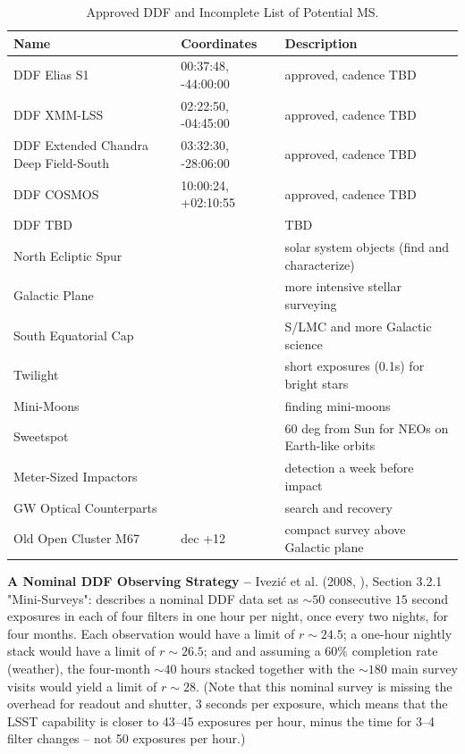 \documentclass[DM,lsstdraft,toc]{lsstdoc}
\begin{document}
\begin{table}[h]
\begin{center}
\begin{footnotesize}
\caption{Approved DDF and Incomplete List of Potential MS.}
\label{tab:ddfms}
\begin{tabular}{lll}
\hline \hline
Name & Coordinates & Description  \\
\hline
DDF Elias S1    & 00:37:48, -44:00:00  & approved, cadence TBD \\
DDF XMM-LSS & 02:22:50, -04:45:00  & approved, cadence TBD  \\
DDF Extended Chandra Deep Field-South & 03:32:30, -28:06:00  & approved, cadence TBD  \\
DDF COSMOS  & 10:00:24, +02:10:55 & approved, cadence TBD  \\
DDF TBD  & & TBD \\
North Ecliptic Spur      & & solar system objects (find and characterize) \\
Galactic Plane             & & more intensive stellar surveying \\
South Equatorial Cap  & & S/LMC and more Galactic science \\
Twilight                        & & short exposures (0.1s) for bright stars \\
Mini-Moons                     &  & finding mini-moons \\
Sweetspot                       & & 60 deg from Sun for NEOs on Earth-like orbits \\
Meter-Sized Impactors     & & detection a week before impact \\
GW Optical Counterparts & & search and recovery \\
Old Open Cluster M67      & dec +12 & compact survey above Galactic plane  \\
\hline
\end{tabular}
\end{footnotesize}
\end{center}
\end{table}

\textbf{A Nominal DDF Observing Strategy -- } Ivezi\'{c} et al. (2008, \citep{2008arXiv0805.2366I}), Section 3.2.1 "Mini-Surveys": describes a nominal DDF data set as $\sim50$ consecutive $15$ second exposures in each of four filters in one hour per night, once every two nights, for four months. Each observation would have a limit of $r\sim24.5$; a one-hour nightly stack would have a limit of $r\sim26.5$; and and assuming a $60\%$ completion rate (weather), the four-month $\sim40$ hours stacked together with the $\sim180$ main survey visits would yield a limit of $r\sim28$. (Note that this nominal survey is missing the overhead for readout and shutter, 3 seconds per exposure, which means that the LSST capability is closer to 43--45 exposures per hour, minus the time for 3--4 filter changes -- not 50 exposures per hour.)
\end{document}
